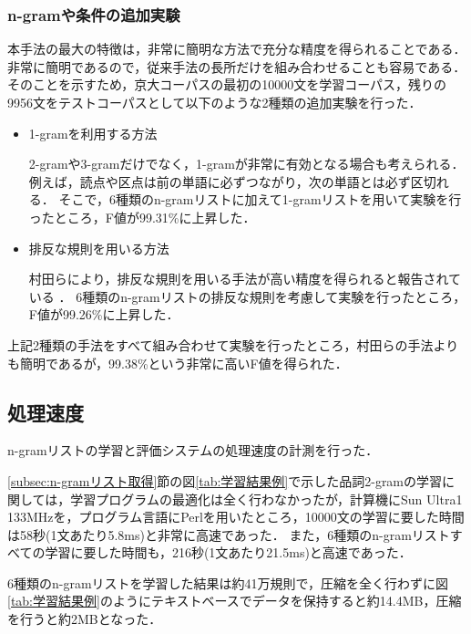\subsubsection{n-gramや条件の追加実験}\label{subsubsec:追加実験}

本手法の最大の特徴は，非常に簡明な方法で充分な精度を得られることである．
非常に簡明であるので，従来手法の長所だけを組み合わせることも容易である．
そのことを示すため，京大コーパスの最初の10000文を学習コーパス，残りの9956文をテストコーパスとして以下のような2種類の追加実験を行った．

\begin{itemize}
\item 1-gramを利用する方法

  2-gramや3-gramだけでなく，1-gramが非常に有効となる場合も考えられる．
  例えば，読点や区点は前の単語に必ずつながり，次の単語とは必ず区切れる．
  そこで，6種類のn-gramリストに加えて1-gramリストを用いて実験を行ったところ，F値が99.31\%に上昇した．

\item 排反な規則を用いる方法

  村田らにより，排反な規則を用いる手法が高い精度を得られると報告されている
  \cite{Murata2000}
  ．
  6種類のn-gramリストの排反な規則を考慮して実験を行ったところ，F値が99.26\%に上昇した．

\end{itemize}

上記2種類の手法をすべて組み合わせて実験を行ったところ，村田らの手法よりも簡明であるが，99.38\%という非常に高いF値を得られた．



\subsection{処理速度}\label{subsec:処理速度}

n-gramリストの学習と評価システムの処理速度の計測を行った．

\ref{subsec:n-gramリスト取得}節の図\ref{tab:学習結果例}で示した品詞2-gramの学習に関しては，学習プログラムの最適化は全く行わなかったが，計算機にSun Ultra1 133MHzを，プログラム言語にPerlを用いたところ，10000文の学習に要した時間は58秒(1文あたり5.8ms)と非常に高速であった．
また，6種類のn-gramリストすべての学習に要した時間も，216秒(1文あたり21.5ms)と高速であった．

6種類のn-gramリストを学習した結果は約41万規則で，圧縮を全く行わずに図\ref{tab:学習結果例}のようにテキストベースでデータを保持すると約14.4MB，圧縮を行うと約2MBとなった．

